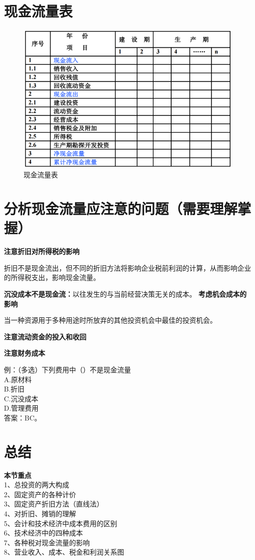 \section{现金流量表}
\begin{figure}[H]
    \centering
    \caption{现金流量表}
    \includegraphics[width=1\linewidth]{image/现金流量表.png}
\end{figure}

\section{分析现金流量应注意的问题（需要理解掌握）}
\noindent \textbf{注意折旧对所得税的影响}

折旧不是现金流出，但不同的折旧方法将影响企业税前利润的计算，从而影响企业的所得税支出，影响现金流量。

\noindent \textbf{沉没成本不是现金流：}以往发生的与当前经营决策无关的成本。
\noindent \textbf{考虑机会成本的影响}

当一种资源用于多种用途时所放弃的其他投资机会中最佳的投资机会。

\noindent \textbf{注意流动资金的投入和收回}

\noindent \textbf{注意财务成本}

例：（多选）下列费用中（）不是现金流量\\
A.原材料\\
B.折旧\\
C.沉没成本\\
D.管理费用\\
答案：BC。

\section{总结}
\noindent \textbf{本节重点}\\
1、总投资的两大构成\\
2、固定资产的各种计价\\
3、固定资产折旧方法（直线法）\\
4、对折旧、摊销的理解\\
5、会计和技术经济中成本费用的区别\\
6、技术经济中的四种成本\\
7、各种税对现金流量的影响\\
8、营业收入、成本、税金和利润关系图

